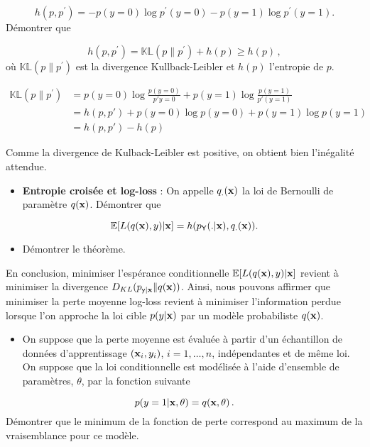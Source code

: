 \documentclass[]{article}
\providecommand{\tightlist}{%
  \setlength{\itemsep}{0pt}\setlength{\parskip}{0pt}}
\begin{document}
\[
h(p,p^\prime) = - p(y = 0) \log p^\prime(y = 0) - p(y = 1) \log p^\prime(y = 1) .
\] Démontrer que

\[
h(p,p^\prime) = \mathbb{KL}(p \| p^\prime) + h(p)  \geq h(p) \, , 
\] où \(\mathbb{KL}(p \| p^\prime)\) est la divergence Kullback-Leibler
et \(h(p)\) l'entropie de \(p\).

\[
\begin{align}
\mathbb{KL}(p \| p^\prime) &= p(y = 0) \log \frac{p(y = 0)}{p \prime y = 0} + p(y =1) \log \frac{p(y=1)}{p \prime (y = 1)}\\
&= h(p, p\prime) + p(y=0)\log p(y=0) + p(y=1) \log p(y=1)\\
&= h(p, p \prime) - h(p)
\end{align}
\]

Comme la divergence de Kulback-Leibler est positive, on obtient bien
l'inégalité attendue.

\begin{itemize}
\tightlist
\item
  \textbf{Entropie croisée et log-loss } : On appelle \(q_{.}({\bf x})\)
  la loi de Bernoulli de paramètre \(q({\bf x})\). Démontrer que
\end{itemize}

\[
\mathbb{E}[L(q({\bf x}), y ) | {\bf x}]  = h(p_{\sf Y}(.|{\bf x}), q_{.}({\bf x}))  .  
\]

\begin{itemize}
\tightlist
\item
  Démontrer le théorème.
\end{itemize}

En conclusion, minimiser l'espérance conditionnelle
\(\mathbb{E}[L(q({\bf x}), y) | {\bf x} ]\) revient à minimiser la
divergence \(D_{KL}( p_{\sf y|{\bf x}} \| q({\bf x}) )\). Ainsi, nous
pouvons affirmer que minimiser la perte moyenne log-loss revient à
minimiser l'information perdue lorsque l'on approche la loi cible
\(p(y|{\bf x})\) par un modèle probabiliste \(q({\bf x})\).

\begin{itemize}
\tightlist
\item
  On suppose que la perte moyenne est évaluée à partir d'un échantillon
  de données d'apprentissage \(({\bf x}_i, y_i)\), \(i = 1, \dots, n\),
  indépendantes et de même loi. On suppose que la loi conditionnelle est
  modélisée à l'aide d'ensemble de paramètres, \(\theta\), par la
  fonction suivante
\end{itemize}

\[
p(y = 1 | {\bf x}, \theta) = q({\bf x}, \theta) \, .
\] Démontrer que le minimum de la fonction de perte correspond au
maximum de la vraisemblance pour ce modèle.
\end{document}
